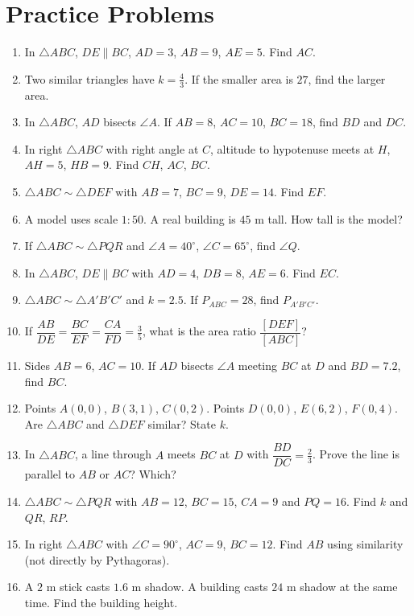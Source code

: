 \documentclass[11pt,a4paper]{article}
\begin{document}
\section*{Practice Problems}
\begin{enumerate}
  \item In $\triangle ABC$, $DE\parallel BC$, $AD=3$, $AB=9$, $AE=5$. Find $AC$.
  \item Two similar triangles have $k=\tfrac{4}{3}$. If the smaller area is $27$, find the larger area.
  \item In $\triangle ABC$, $AD$ bisects $\angle A$. If $AB=8$, $AC=10$, $BC=18$, find $BD$ and $DC$.
  \item In right $\triangle ABC$ with right angle at $C$, altitude to hypotenuse meets at $H$, $AH=5$, $HB=9$. Find $CH$, $AC$, $BC$.
  \item $\triangle ABC\sim\triangle DEF$ with $AB=7$, $BC=9$, $DE=14$. Find $EF$.
  \item A model uses scale $1:50$. A real building is $45$ m tall. How tall is the model?
  \item If $\triangle ABC\sim\triangle PQR$ and $\angle A=40^\circ$, $\angle C=65^\circ$, find $\angle Q$.
  \item In $\triangle ABC$, $DE\parallel BC$ with $AD=4$, $DB=8$, $AE=6$. Find $EC$.
  \item $\triangle ABC\sim\triangle A'B'C'$ and $k=2.5$. If $P_{ABC}=28$, find $P_{A'B'C'}$.
  \item If $\dfrac{AB}{DE}=\dfrac{BC}{EF}=\dfrac{CA}{FD}=\tfrac{3}{5}$, what is the area ratio $\dfrac{[DEF]}{[ABC]}$?
  \item Sides $AB=6$, $AC=10$. If $AD$ bisects $\angle A$ meeting $BC$ at $D$ and $BD=7.2$, find $BC$.
  \item Points $A(0,0)$, $B(3,1)$, $C(0,2)$. Points $D(0,0)$, $E(6,2)$, $F(0,4)$. Are $\triangle ABC$ and $\triangle DEF$ similar? State $k$.
  \item In $\triangle ABC$, a line through $A$ meets $BC$ at $D$ with $\dfrac{BD}{DC}=\tfrac{2}{3}$. Prove the line is parallel to $AB$ or $AC$? Which?
  \item $\triangle ABC\sim\triangle PQR$ with $AB=12$, $BC=15$, $CA=9$ and $PQ=16$. Find $k$ and $QR$, $RP$.
  \item In right $\triangle ABC$ with $\angle C=90^\circ$, $AC=9$, $BC=12$. Find $AB$ using similarity (not directly by Pythagoras).
  \item A $2$ m stick casts $1.6$ m shadow. A building casts $24$ m shadow at the same time. Find the building height.

\end{enumerate}
\end{document}
